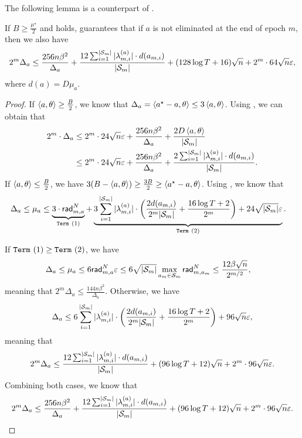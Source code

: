 The following lemma is a counterpart of .

\begin{lemma}\label{lem:bound_2_mis_reward}
    If $B\geq \frac{\mu^\star}{2}$ and  holds,  guarantees that if $a$ is not eliminated at the end of epoch $m$, then we also have
    \begin{align*}
        2^m\Delta_a\leq \frac{256n\beta^2}{\Delta_a} +\frac{12\sum_{i=1}^{|{\mathcal{S}}_m|}|\lambda_{m,i}^{(a)}|\cdot d(a_{m,i})}{|{\mathcal{S}}_m|}+(128\log T +16)\sqrt{n}+2^m\cdot 64\sqrt{n}\varepsilon,
    \end{align*}
    where $d(a)=D\mu_a$.
\end{lemma}
\begin{proof}
    If $\left\langle {a,\theta} \right\rangle\geq \frac{B}{2}$, we know that $\Delta_a = \left\langle {a^\star-a,\theta} \right\rangle \leq 3\left\langle {a,\theta} \right\rangle$. Using , we can obtain that
    \begin{align*}
        2^m\cdot \Delta_a &\leq 2^m\cdot 24\sqrt{n}\varepsilon+\frac{256n\beta^2}{\Delta_a} + \frac{2D\left\langle {a,\theta} \right\rangle}{|{\mathcal{S}}_m|} \\
        &\leq 2^m\cdot 24\sqrt{n}\varepsilon+\frac{256n\beta^2}{\Delta_a} + \frac{2\sum_{i=1}^{|{\mathcal{S}}_m|}|\lambda_{m,i}^{(a)}|\cdot d(a_{m,i})}{|{\mathcal{S}}_m|}.
    \end{align*}
    If $\left\langle {a,\theta} \right\rangle \leq \frac{B}{2}$, we have $3(B-\left\langle {a,\theta} \right\rangle ) \geq \frac{3B}{2} \geq \left\langle {a^\star-a,\theta} \right\rangle$. Using , we know that
    \begin{align*}
        \Delta_a &\leq \mu_a \leq \underbrace{3\cdot \mathsf{rad}_{m,a}^{N}}_{\texttt{Term} ~(1)}+ \underbrace{3\sum_{i=1}^{|{\mathcal{S}}_m|}|\lambda_{m,i}^{(a)}|\cdot\left(\frac{2d(a_{m,i})}{2^m|{\mathcal{S}}_m|}+\frac{16\log T +2}{2^m}\right) + 24\sqrt{|{\mathcal{S}}_m|}\varepsilon}_{\texttt{Term} ~(2)}.
    \end{align*}

    If $\texttt{Term} ~(1)\geq \texttt{Term} ~(2)$, we have
    \begin{align*}
        \Delta_a &\leq \mu_a \leq 6\mathsf{rad}_{m,a}^{N} \varepsilon \leq 6\sqrt{|{\mathcal{S}}_m|}\max_{a_m\in{\mathcal{S}}_m}\mathsf{rad}_{m,a_m}^N \leq \frac{12\beta\sqrt{n}}{2^{m/2}},
    \end{align*}
    meaning that $2^m\Delta_a \leq \frac{144n\beta^2}{\Delta_a}$.
    Otherwise, we have
    \begin{align*}
        \Delta_a\leq 6\sum_{i=1}^{|{\mathcal{S}}_m|}|\lambda_{m,i}^{(a)}|\cdot \left(\frac{2d(a_{m,i})}{2^m|{\mathcal{S}}_m|}+\frac{16\log T +2}{2^m}\right) + 96\sqrt{n}\varepsilon,
    \end{align*}
    meaning that
    \begin{align*}
        2^m\Delta_a\leq \frac{12\sum_{i=1}^{|{\mathcal{S}}_m|}|\lambda_{m,i}^{(a)}|\cdot d(a_{m,i})}{|{\mathcal{S}}_m|}+(96\log T +12)\sqrt{n}+2^m\cdot 96\sqrt{n}\varepsilon.
    \end{align*}
    Combining both cases, we know that
    \begin{align*}
        2^m\Delta_a\leq \frac{256n\beta^2}{\Delta_a} +\frac{12\sum_{i=1}^{|{\mathcal{S}}_m|}|\lambda_{m,i}^{(a)}|\cdot d(a_{m,i})}{|{\mathcal{S}}_m|}+(96\log T +12)\sqrt{n}+2^m\cdot 96\sqrt{n}\varepsilon.
    \end{align*}
\end{proof}

